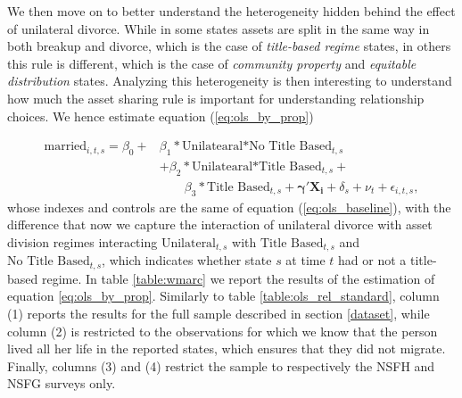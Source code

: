 \documentclass[12pt]{article}
\numberwithin{table}{section}
\begin{document}
We then move on to better understand the heterogeneity hidden behind the effect of unilateral divorce. While in some states assets are split in the same way in both breakup and divorce, which is the case of \textit{title-based regime} states, in others this rule is different, which is the case of \textit{community property} and \textit{equitable distribution} states. Analyzing this heterogeneity is then interesting to understand how much the asset sharing rule is important for understanding relationship choices.  We hence estimate equation (\ref{eq:ols_by_prop})


\begin{equation}\label{eq:ols_by_prop}
\begin{split}
\text{married}_{i,t,s}=\beta_0+&\beta_1*\text{Unilatearal*No Title Based}_{t,s}\\&+\beta_2*\text{Unilatearal*Title Based}_{t,s}+\\&\quad\quad\beta_3*\text{Title Based}_{t,s}+\mathbf{\gamma'}\mathbf{X_i}+\delta_s+\nu_t+\epsilon_{i,t,s},
\end{split}
\end{equation}
whose  indexes and controls are the same of equation (\ref{eq:ols_baseline}), with the difference that now we capture the interaction of unilateral divorce with asset division regimes interacting $\text{Unilateral}_{t,s}$ with  $\text{Title Based}_{t,s}$ and $\text{No Title Based}_{t,s}$, which indicates whether state $s$ at time $t$ had or not a title-based regime. In table \ref{table:wmarc} we report the results of the estimation of equation \ref{eq:ols_by_prop}. Similarly to table \ref{table:ols_rel_standard}, column (1) reports the results for the full sample described in section \ref{dataset}, while column (2) is restricted to the observations for which we know that the person lived all her life in the reported states, which ensures that they did not migrate. Finally, columns (3) and (4) restrict the sample to respectively the NSFH and NSFG surveys only.
\end{document}
